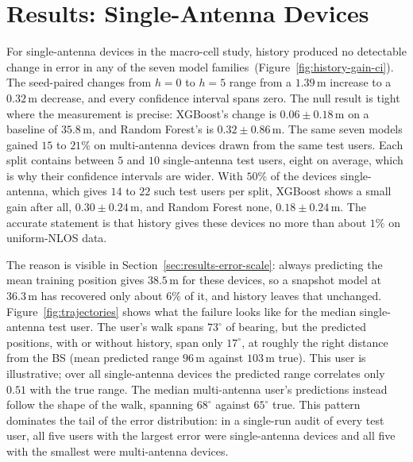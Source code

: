 \section{Results: Single-Antenna Devices}
\label{sec:results-single}

For single-antenna devices in the macro-cell study, history produced no detectable change in error in any of the seven model families~(Figure~\ref{fig:history-gain-ci}). The seed-paired changes from $h=0$ to $h=5$ range from a $1.39\,\text{m}$ increase to a $0.32\,\text{m}$ decrease, and every confidence interval spans zero. The null result is tight where the measurement is precise: XGBoost's change is $0.06 \pm 0.18\,\text{m}$ on a baseline of $35.8\,\text{m}$, and Random Forest's is $0.32 \pm 0.86\,\text{m}$. The same seven models gained $15$ to $21\%$ on multi-antenna devices drawn from the same test users. Each split contains between $5$ and $10$ single-antenna test users, eight on average, which is why their confidence intervals are wider. With $50\%$ of the devices single-antenna, which gives $14$ to $22$ such test users per split, XGBoost shows a small gain after all, $0.30 \pm 0.24\,\text{m}$, and Random Forest none, $0.18 \pm 0.24\,\text{m}$. The accurate statement is that history gives these devices no more than about $1\%$ on uniform-NLOS data.

The reason is visible in Section~\ref{sec:results-error-scale}: always predicting the mean training position gives $38.5\,\text{m}$ for these devices, so a snapshot model at $36.3\,\text{m}$ has recovered only about $6\%$ of it, and history leaves that unchanged. Figure~\ref{fig:trajectories} shows what the failure looks like for the median single-antenna test user. The user's walk spans $73^\circ$ of bearing, but the predicted positions, with or without history, span only $17^\circ$, at roughly the right distance from the BS (mean predicted range $96\,\text{m}$ against $103\,\text{m}$ true). This user is illustrative; over all single-antenna devices the predicted range correlates only $0.51$ with the true range. The median multi-antenna user's predictions instead follow the shape of the walk, spanning $68^\circ$ against $65^\circ$ true. This pattern dominates the tail of the error distribution: in a single-run audit of every test user, all five users with the largest error were single-antenna devices and all five with the smallest were multi-antenna devices.

